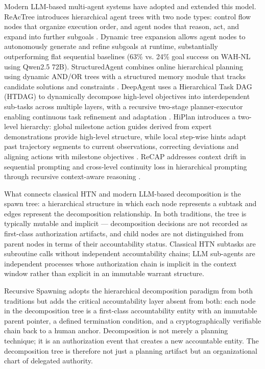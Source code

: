 Modern LLM-based multi-agent systems have adopted and extended this model. ReAcTree introduces hierarchical agent trees with two node types: control flow nodes that organize execution order, and agent nodes that reason, act, and expand into further subgoals \cite{reactree2025}. Dynamic tree expansion allows agent nodes to autonomously generate and refine subgoals at runtime, substantially outperforming flat sequential baselines (63\% vs. 24\% goal success on WAH-NL using Qwen2.5 72B). StructuredAgent combines online hierarchical planning using dynamic AND/OR trees with a structured memory module that tracks candidate solutions and constraints \cite{structuredagent2025}. DeepAgent uses a Hierarchical Task DAG (HTDAG) to dynamically decompose high-level objectives into interdependent sub-tasks across multiple layers, with a recursive two-stage planner-executor enabling continuous task refinement and adaptation \cite{deepagent2025}. HiPlan introduces a two-level hierarchy: global milestone action guides derived from expert demonstrations provide high-level structure, while local step-wise hints adapt past trajectory segments to current observations, correcting deviations and aligning actions with milestone objectives \cite{hiplan2025}. ReCAP addresses context drift in sequential prompting and cross-level continuity loss in hierarchical prompting through recursive context-aware reasoning \cite{recap2025}.

What connects classical HTN and modern LLM-based decomposition is the spawn tree: a hierarchical structure in which each node represents a subtask and edges represent the decomposition relationship. In both traditions, the tree is typically mutable and implicit — decomposition decisions are not recorded as first-class authorization artifacts, and child nodes are not distinguished from parent nodes in terms of their accountability status. Classical HTN subtasks are subroutine calls without independent accountability chains; LLM sub-agents are independent processes whose authorization chain is implicit in the context window rather than explicit in an immutable warrant structure.

Recursive Spawning adopts the hierarchical decomposition paradigm from both traditions but adds the critical accountability layer absent from both: each node in the decomposition tree is a first-class accountability entity with an immutable parent pointer, a defined termination condition, and a cryptographically verifiable chain back to a human anchor. Decomposition is not merely a planning technique; it is an authorization event that creates a new accountable entity. The decomposition tree is therefore not just a planning artifact but an organizational chart of delegated authority.


